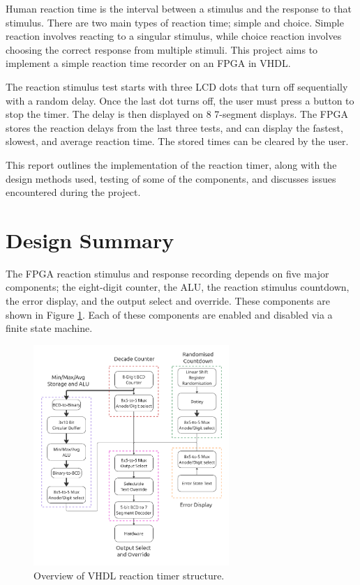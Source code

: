 \documentclass[11pt]{article}
\begin{document}
Human reaction time is the interval between a stimulus and the response to that stimulus. There are two main types of reaction time; simple and choice. Simple reaction involves reacting to a singular stimulus, while choice reaction involves choosing the correct response from multiple stimuli. This project aims to implement a simple reaction time recorder on an FPGA in VHDL.

The reaction stimulus test starts with three LCD dots that turn off sequentially with a random delay. Once the last dot turns off, the user must press a button to stop the timer. The delay is then displayed on 8 7-segment displays. The FPGA stores the reaction delays from the last three tests, and can display the fastest, slowest, and average reaction time. The stored times can be cleared by the user.

This report outlines the implementation of the reaction timer, along with the design methods used, testing of some of the components, and discusses issues encountered during the project.

\section{Design Summary}

The FPGA reaction stimulus and response recording depends on five major components; the eight-digit counter, the ALU, the reaction stimulus countdown, the error display, and the output select and override. These components are shown in Figure \ref{project_structure}. Each of these components are enabled and disabled via a finite state machine.

\begin{figure}[H]
	\centering
	\includegraphics[width=0.66\textwidth]{project_overall_structure.png}
	\caption{Overview of VHDL reaction timer structure.}
	\label{project_structure}
\end{figure}
\end{document}

